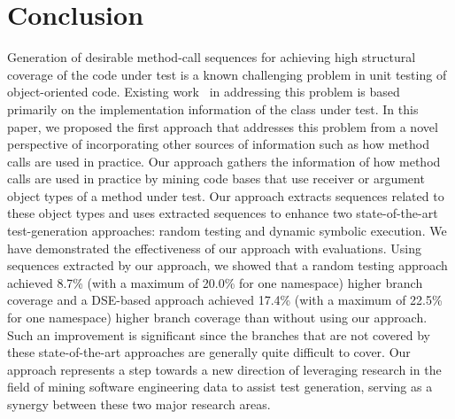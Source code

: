 \section{Conclusion}
\label{sec:concl}

Generation of desirable method-call sequences for achieving high structural coverage of the code under test is a known challenging problem in unit testing of object-oriented code. Existing work~\cite{csallner:jcrasher, khurshid:symbolic, xie:rostra} in addressing this problem is based primarily on the implementation information of the class under test. In this paper, we proposed the first approach that addresses this problem from a novel perspective of incorporating other sources of information such as how method calls are used in practice. Our approach gathers the information of how method calls are used in practice by mining code bases that use receiver or argument object types of a method under test. Our approach extracts sequences related to these object types and uses extracted sequences to enhance two state-of-the-art test-generation approaches: random testing and dynamic symbolic execution. We have demonstrated the effectiveness of our approach with  evaluations. Using sequences extracted by our approach, we showed that a random testing approach achieved 8.7\% (with a maximum of 20.0\% for one namespace) higher branch coverage and a DSE-based approach achieved 17.4\% (with a maximum of 22.5\% for one namespace) higher branch coverage than without using our approach. Such an improvement is significant since the branches that are not covered by these state-of-the-art approaches are generally quite difficult to cover. Our approach represents a step towards a new direction of leveraging research in the field of mining software engineering data to assist test generation, serving as a synergy between these two major research areas.


